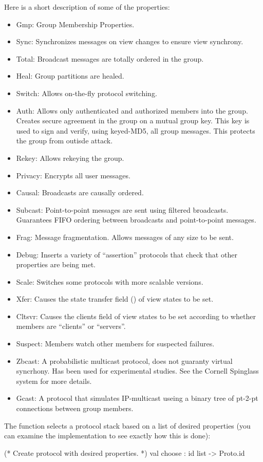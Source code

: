 Here is a short description of some of the properties:
\begin{itemize}
\item {Gmp:} Group Membership Properties.
\item {Sync:} Synchronizes messages on view changes to ensure view synchrony.
\item {Total:} Broadcast messages are totally ordered in the group.
\item {Heal:} Group partitions are healed.
\item {Switch:} Allows on-the-fly protocol switching.
\item {Auth:} Allows only authenticated and authorized members into
the group. Creates secure agreement in the group on a mutual group
key. This key is used to sign and verify, using keyed-MD5, all group
messages. This protects the group from outisde attack. 
\item {Rekey:} Allows rekeying the group.  
\item {Privacy:} Encrypts all user messages. 
\item {Causal:} Broadcasts are causally ordered.
\item {Subcast:} Point-to-point messages are sent using filtered broadcasts.
Guarantees FIFO ordering between broadcasts and point-to-point messages.
\item {Frag:} Message fragmentation.  Allows messages of any size to be sent.
\item {Debug:} Inserts a variety of ``assertion'' protocols that check that
other properties are being met.
\item {Scale:} Switches some protocols with more scalable versions.
\item {Xfer:} Causes the state transfer field () of view states to
be set.
\item {Cltsvr:} Causes the clients field of view states to be set according to
whether members are ``clients'' or ``servers''.
\item {Suspect:} Members watch other members for suspected failures.
\item {Zbcast:} A probabilistic multicast protocol, does not guaranty
virtual syncrhony. Has been used for experimental studies. See the
Cornell Spinglass system for more details.
\item {Gcast:} A protocol that simulates IP-multicast useing a binary
tree of pt-2-pt connections between group members.
\end{itemize}

The  function selects a protocol stack based on a list
of desired properties (you can examine the implementation to see exactly how
this is done):
\begin{codebox}
(* Create protocol with desired properties.
 *)
val choose : id list -> Proto.id
\end{codebox}

